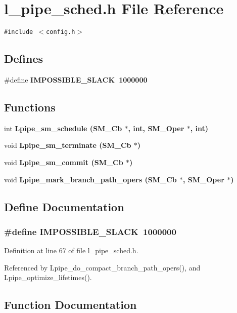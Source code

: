 \section{l\_\-pipe\_\-sched.h File Reference}
\label{l__pipe__sched_8h}
{\tt \#include $<$config.h$>$}\par
\subsection*{Defines}
\begin{CompactItemize}
\item 
\#define \bf{IMPOSSIBLE\_\-SLACK}~1000000
\end{CompactItemize}
\subsection*{Functions}
\begin{CompactItemize}
\item 
int \bf{Lpipe\_\-sm\_\-schedule} (\bf{SM\_\-Cb} $\ast$, int, \bf{SM\_\-Oper} $\ast$, int)
\item 
void \bf{Lpipe\_\-sm\_\-terminate} (\bf{SM\_\-Cb} $\ast$)
\item 
void \bf{Lpipe\_\-sm\_\-commit} (\bf{SM\_\-Cb} $\ast$)
\item 
void \bf{Lpipe\_\-mark\_\-branch\_\-path\_\-opers} (\bf{SM\_\-Cb} $\ast$, \bf{SM\_\-Oper} $\ast$)
\end{CompactItemize}


\subsection{Define Documentation}
\subsubsection{\setlength{\rightskip}{0pt plus 5cm}\#define IMPOSSIBLE\_\-SLACK~1000000}\label{l__pipe__sched_8h_c5c094a855c2acb6fc2483dfd24f5bf6}




Definition at line 67 of file l\_\-pipe\_\-sched.h.

Referenced by Lpipe\_\-do\_\-compact\_\-branch\_\-path\_\-opers(), and Lpipe\_\-optimize\_\-lifetimes().

\subsection{Function Documentation}
